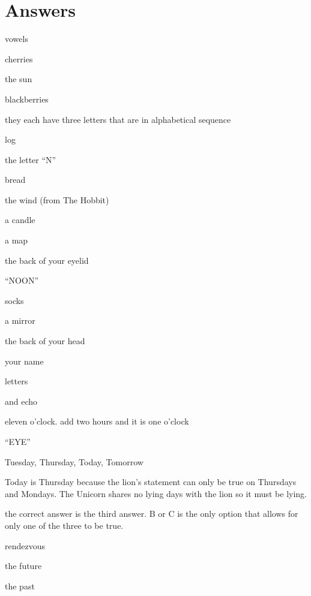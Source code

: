 \documentclass[green]{guildcamp2}
\begin{document}
\section{Answers}
\begin{enum}
\item vowels
\item cherries
\item the sun
\item blackberries
\item they each have three letters that are in alphabetical sequence
\item log
\item the letter ``N''
\item bread
\item the wind (from The Hobbit)
\item a candle
\item a map
\item the back of your eyelid
\item ``NOON''
\item socks
\item a mirror
\item the back of your head
\item your name
\item letters
\item and echo
\item eleven o'clock. add two hours and it is one o'clock
\item ``EYE''
\item Tuesday, Thursday, Today, Tomorrow
\item Today is Thursday because the lion's statement can only be true on Thursdays and Mondays. The Unicorn shares no lying days with the lion so it must be lying.
\item the correct answer is the third answer. B or C is the only option that allows for only one of the three to be true.
\item rendezvous
\item the future
\item the past
\end{enum}
\end{document}
